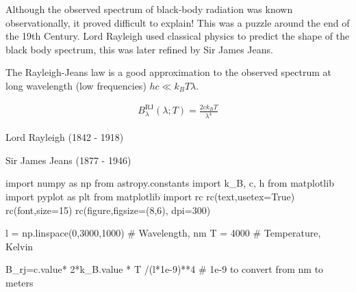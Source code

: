 \documentclass[
  letterpaper,
  DIV=11,
  numbers=noendperiod]{scrartcl}
\newenvironment{Shaded}{\begin{snugshade}}{\end{snugshade}}
\newcommand{\CommentTok}[1]{\textcolor[rgb]{0.37,0.37,0.37}{#1}}
\newcommand{\DecValTok}[1]{\textcolor[rgb]{0.68,0.00,0.00}{#1}}
\newcommand{\FloatTok}[1]{\textcolor[rgb]{0.68,0.00,0.00}{#1}}
\newcommand{\ImportTok}[1]{\textcolor[rgb]{0.00,0.46,0.62}{#1}}
\newcommand{\NormalTok}[1]{\textcolor[rgb]{0.00,0.23,0.31}{#1}}
\newcommand{\OperatorTok}[1]{\textcolor[rgb]{0.37,0.37,0.37}{#1}}
\newcommand{\StringTok}[1]{\textcolor[rgb]{0.13,0.47,0.30}{#1}}
\newcommand{\VariableTok}[1]{\textcolor[rgb]{0.07,0.07,0.07}{#1}}
\begin{document}
Although the observed spectrum of black-body radiation was known
observationally, it proved difficult to explain! This was a puzzle
around the end of the 19th Century. Lord Rayleigh used classical physics
to predict the shape of the black body spectrum, this was later refined
by Sir James Jeans.

The Rayleigh-Jeans law is a good approximation to the observed spectrum
at long wavelength (low frequencies) \(hc\ll k_BT\lambda\).

\begin{align}
B_\lambda^\mathrm{RJ}(\lambda; T) = \frac{2ck_B T}{\lambda^4}
\end{align}

Lord Rayleigh (1842 - 1918)

Sir James Jeans (1877 - 1946)

\begin{Shaded}
\begin{Highlighting}[]
\ImportTok{import}\NormalTok{ numpy }\ImportTok{as}\NormalTok{ np}
\ImportTok{from}\NormalTok{ astropy.constants }\ImportTok{import}\NormalTok{ k\_B, c, h}
\ImportTok{from}\NormalTok{ matplotlib }\ImportTok{import}\NormalTok{ pyplot }\ImportTok{as}\NormalTok{ plt}
\ImportTok{from}\NormalTok{ matplotlib }\ImportTok{import}\NormalTok{ rc}
\NormalTok{rc(}\StringTok{\textquotesingle{}text\textquotesingle{}}\NormalTok{,usetex}\OperatorTok{=}\VariableTok{True}\NormalTok{)}
\NormalTok{rc(}\StringTok{\textquotesingle{}font\textquotesingle{}}\NormalTok{,size}\OperatorTok{=}\DecValTok{15}\NormalTok{)}
\NormalTok{rc(}\StringTok{\textquotesingle{}figure\textquotesingle{}}\NormalTok{,figsize}\OperatorTok{=}\NormalTok{(}\DecValTok{8}\NormalTok{,}\DecValTok{6}\NormalTok{), dpi}\OperatorTok{=}\DecValTok{300}\NormalTok{)}

\NormalTok{l }\OperatorTok{=}\NormalTok{ np.linspace(}\DecValTok{0}\NormalTok{,}\DecValTok{3000}\NormalTok{,}\DecValTok{1000}\NormalTok{) }\CommentTok{\# Wavelength, nm}
\NormalTok{T }\OperatorTok{=} \DecValTok{4000} \CommentTok{\# Temperature, Kelvin}

\NormalTok{B\_rj}\OperatorTok{=}\NormalTok{c.value}\OperatorTok{*} \DecValTok{2}\OperatorTok{*}\NormalTok{k\_B.value }\OperatorTok{*}\NormalTok{ T }\OperatorTok{/}\NormalTok{(l}\OperatorTok{*}\FloatTok{1e{-}9}\NormalTok{)}\OperatorTok{**}\DecValTok{4} \CommentTok{\# 1e{-}9 to convert from nm to meters}
\end{Highlighting}
\end{Shaded}
\end{document}
